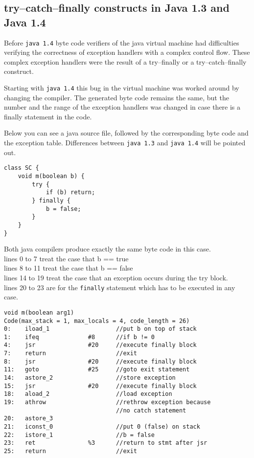 \documentclass[11pt,twoside,a4paper,draft]{article}
\begin{document}
\subsection {try--catch--finally constructs in Java 1.3 and Java 1.4}

Before \texttt{java 1.4} byte code verifiers of the java virtual machine had
difficulties verifying the correctness of exception handlers with a complex
control flow. These complex exception handlers were the result of a 
try--finally or a try--catch--finally construct.

Starting with \texttt{java 1.4} this bug in the virtual machine was worked around by
changing the compiler. The generated byte code remains the same, but the number
and the range of the exception handlers was changed in case there is a
finally statement in the code. 

Below you can see a java source file, followed by the corresponding byte code
and the exception table. Differences between \texttt{java 1.3} and \texttt{java 1.4} will be pointed out.

\begin{verbatim}
class SC {
    void m(boolean b) {
        try {
            if (b) return;
        } finally {
            b = false;
        }
    }
}
\end{verbatim}
Both java compilers produce exactly the same byte code in this case.
\\lines 0 to 7 treat the case that b == true
\\lines 8 to 11 treat the case that b == false
\\lines 14 to 19 treat the case that an exception occurs during the
try block.
\\lines 20 to 23 are for the \texttt{finally} statement which has to be 
executed in any case.

\begin{verbatim}
void m(boolean arg1)
Code(max_stack = 1, max_locals = 4, code_length = 26)
0:    iload_1                   //put b on top of stack
1:    ifeq              #8      //if b != 0
4:    jsr               #20     //execute finally block
7:    return                    //exit
8:    jsr               #20     //execute finally block
11:   goto              #25     //goto exit statement
14:   astore_2                  //store exception
15:   jsr               #20     //execute finally block
18:   aload_2                   //load exception
19:   athrow                    //rethrow exception because 
                                //no catch statement
20:   astore_3			
21:   iconst_0                  //put 0 (false) on stack
22:   istore_1                  //b = false
23:   ret               %3      //return to stmt after jsr
25:   return                    //exit

\end{verbatim}
\end{document}
